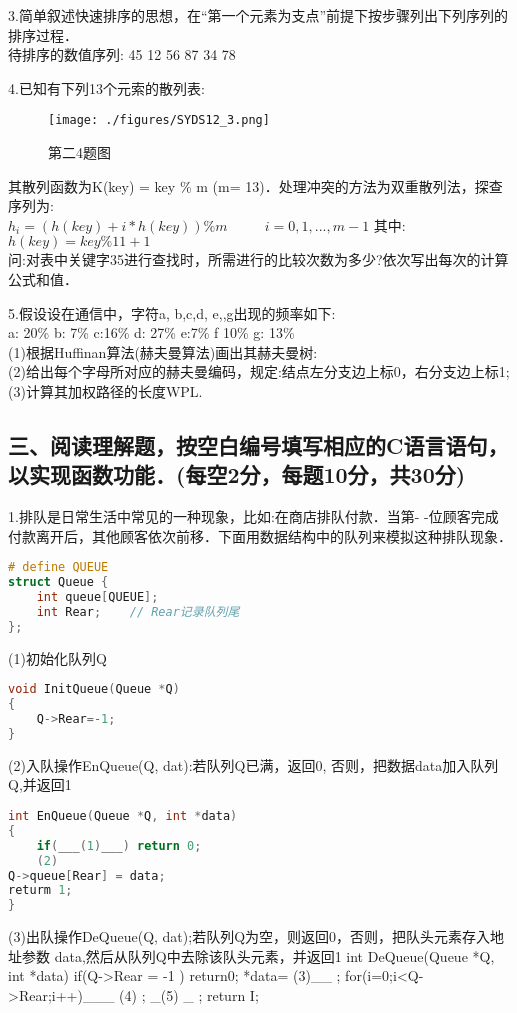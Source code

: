 3.简单叙述快速排序的思想，在“第一个元素为支点”前提下按步骤列出下列序列的排序过程． \\
待排序的数值序列: 45 12 56 87 34 78

4.已知有下列13个元索的散列表:
\begin{figure}[ht]
\centering
\texttt{[image: ./figures/SYDS12\_3.png]}
\caption{第二4题图} \label{SYDS12_fig3}
\end{figure}
其散列函数为K(key) = key \% m (m= 13)．处理冲突的方法为双重散列法，探查序列为:  \\
$h_i=(h(key)+i*h(key))\%m$ $\qquad$ $i=0,1,...,m-1$  其中: $h(key)=key\%11+1$ \\
问:对表中关键字35进行查找时，所需进行的比较次数为多少?依次写出每次的计算公式和值．

5.假设设在通信中，字符a, b,c,d, e,,g出现的频率如下: \\
a: 20\% b: 7\% c:16\% d: 27\% e:7\% f 10\% g: 13\% \\
(1)根据Huffinan算法(赫夫曼算法)画出其赫夫曼树: \\
(2)给出每个字母所对应的赫夫曼编码，规定:结点左分支边上标0，右分支边上标1; \\
(3)计算其加权路径的长度WPL.

\subsection{三、阅读理解题，按空白编号填写相应的C语言语句，以实现函数功能．(每空2分，每题10分，共30分)}

1.排队是日常生活中常见的一种现象，比如:在商店排队付款．当第- -位顾客完成付款离开后，其他顾客依次前移．下面用数据结构中的队列来模拟这种排队现象． \\
\begin{lstlisting}[language=cpp]
# define QUEUE
struct Queue {
    int queue[QUEUE];
    int Rear;    // Rear记录队列尾
};
\end{lstlisting}
(1)初始化队列Q
\begin{lstlisting}[language=cpp]
void InitQueue(Queue *Q)
{
    Q->Rear=-1;
}
\end{lstlisting}

(2)入队操作EnQueue(Q, dat):若队列Q已满，返回0, 否则，把数据data加入队列Q,并返回1
\begin{lstlisting}[language=cpp]
int EnQueue(Queue *Q, int *data)
{
    if(___(1)___) return 0;
    (2)
Q->queue[Rear] = data;
returm 1;
}
\end{lstlisting}

(3)出队操作DeQueue(Q, dat);若队列Q为空，则返回0，否则，把队头元素存入地址参数
data,然后从队列Q中去除该队头元素，并返回1
int DeQueue(Queue *Q, int *data)
if(Q->Rear = -1 ) return0;
*data=
(3)__ ;
for(i=0;i<Q->Rear;i++)___ (4) ;
_(5) _ ;
return I;
